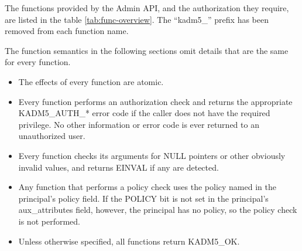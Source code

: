 The functions provided by the Admin API, and the authorization they
require, are listed in the table \ref{tab:func-overview}.  The
``kadm5_'' prefix has been removed from each function name.

The function semantics in the following sections omit details that are
the same for every function.

\begin{itemize}
\item The effects of every function are atomic.

\item Every function performs an authorization check and returns
the appropriate KADM5_AUTH_* error code if the caller does not
have the required privilege.  No other information or error code is
ever returned to an unauthorized user.

\item Every function checks its arguments for NULL pointers or other
obviously invalid values, and returns EINVAL if any are detected.

\item Any function that performs a policy check uses the policy named
in the principal's policy field.  If the POLICY bit is not set in the
principal's aux_attributes field, however, the principal has no
policy, so the policy check is not performed.

\item Unless otherwise specified, all functions return KADM5_OK.
\end{itemize}

